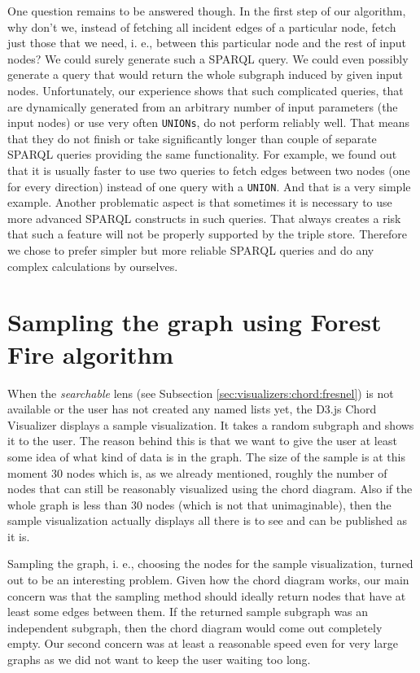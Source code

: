 One question remains to be answered though. In the first step of our algorithm, why don’t we, instead of fetching all incident edges of a particular node, fetch just those that we need, i. e., between this particular node and the rest of input nodes? We could surely generate such a SPARQL query. We could even possibly generate a query that would return the whole subgraph induced by given input nodes. Unfortunately, our experience shows that such complicated queries, that are dynamically generated from an arbitrary number of input parameters (the input nodes) or use very often \texttt{UNIONs}, do not perform reliably well. That means that they do not finish or take significantly longer than couple of separate SPARQL queries providing the same functionality. For example, we found out that it is usually faster to use two queries to fetch edges between two nodes (one for every direction) instead of one query with a \texttt{UNION}. And that is a very simple example. Another problematic aspect is that sometimes it is necessary to use more advanced SPARQL constructs in such queries. That always creates a risk that such a feature will not be properly supported by the triple store. Therefore we chose to prefer simpler but more reliable SPARQL queries and do any complex calculations by ourselves.

\section{Sampling the graph using Forest Fire algorithm}

When the \emph{searchable} lens (see Subsection \ref{sec:visualizers:chord:fresnel}) is not available or the user has not created any named lists yet, the D3.js Chord Visualizer displays a sample visualization. It takes a random subgraph and shows it to the user. The reason behind this is that we want to give the user at least some idea of what kind of data is in the graph. The size of the sample is at this moment 30 nodes which is, as we already mentioned, roughly the number of nodes that can still be reasonably visualized using the chord diagram. Also if the whole graph is less than 30 nodes (which is not that unimaginable), then the sample visualization actually displays all there is to see and can be published as it is.

Sampling the graph, i. e., choosing the nodes for the sample visualization, turned out to be an interesting problem. Given how the chord diagram works, our main concern was that the sampling method should ideally return nodes that have at least some edges between them. If the returned sample subgraph was an independent subgraph, then the chord diagram would come out completely empty. Our second concern was at least a reasonable speed even for very large graphs as we did not want to keep the user waiting too long.

